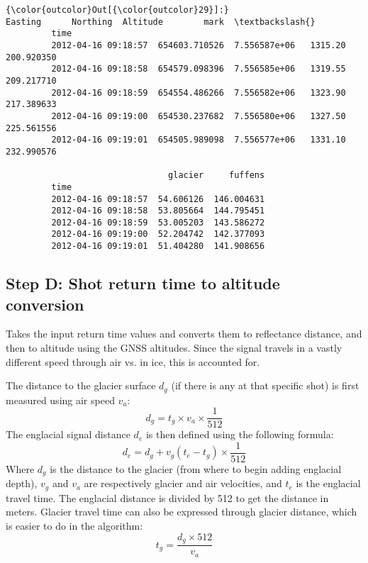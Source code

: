 \documentclass[11pt]{article}
\begin{document}
\begin{Verbatim}[commandchars=\\\{\}]
{\color{outcolor}Out[{\color{outcolor}29}]:}                            Easting      Northing  Altitude        mark  \textbackslash{}
         time                                                                     
         2012-04-16 09:18:57  654603.710526  7.556587e+06   1315.20  200.920350   
         2012-04-16 09:18:58  654579.098396  7.556585e+06   1319.55  209.217710   
         2012-04-16 09:18:59  654554.486266  7.556582e+06   1323.90  217.389633   
         2012-04-16 09:19:00  654530.237682  7.556580e+06   1327.50  225.561556   
         2012-04-16 09:19:01  654505.989098  7.556577e+06   1331.10  232.990576   
         
                                glacier     fuffens  
         time                                        
         2012-04-16 09:18:57  54.606126  146.004631  
         2012-04-16 09:18:58  53.805664  144.795451  
         2012-04-16 09:18:59  53.005203  143.586272  
         2012-04-16 09:19:00  52.204742  142.377093  
         2012-04-16 09:19:01  51.404280  141.908656  
\end{Verbatim}
            
    \subsection{Step D: Shot return time to altitude
conversion}\label{step-d-shot-return-time-to-altitude-conversion}

Takes the input return time values and converts them to reflectance
distance, and then to altitude using the GNSS altitudes. Since the
signal travels in a vastly different speed through air vs. in ice, this
is accounted for.

The distance to the glacier surface \(d_g\) (if there is any at that
specific shot) is first measured using air speed \(v_a\):
\[ d_g = t_g \times v_a \times \frac{1}{512}\] The englacial signal
distance \(d_e\) is then defined using the following formula:
\[ d_e = d_g + v_g (t_e - t_g) \times \frac{1}{512}\] Where \(d_g\) is
the distance to the glacier (from where to begin adding englacial
depth), \(v_g\) and \(v_a\) are respectively glacier and air velocities,
and \(t_e\) is the englacial travel time. The englacial distance is
divided by 512 to get the distance in meters. Glacier travel time can
also be expressed through glacier distance, which is easier to do in the
algorithm: \[t_g = \frac{d_g \times 512}{v_a} \]
\end{document}
